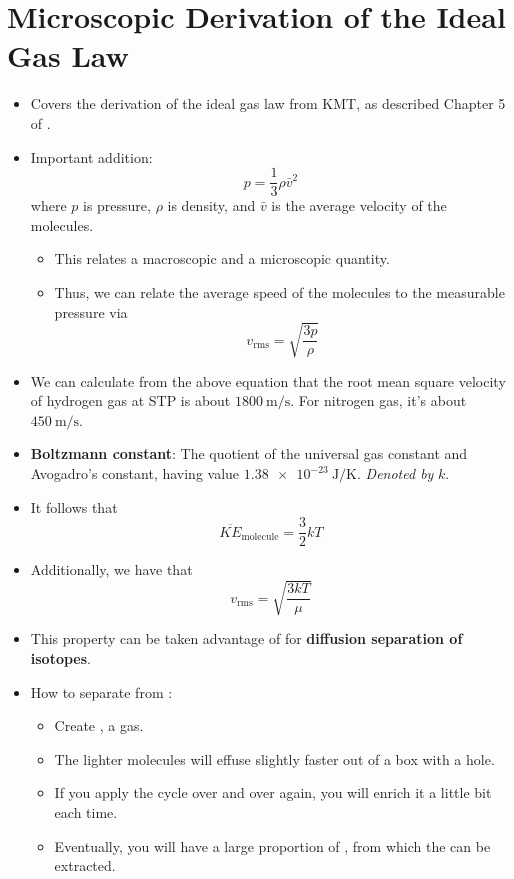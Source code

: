 \documentclass[../notes.tex]{subfiles}
\begin{document}
\section{Microscopic Derivation of the Ideal Gas Law}
\begin{itemize}
    \item Covers the derivation of the ideal gas law from KMT, as described Chapter 5 of \textcite{bib:APChemNotes}.
    \item Important addition:
    \begin{equation*}
        p = \frac{1}{3}\rho\bar{v}^2
    \end{equation*}
    where $p$ is pressure, $\rho$ is density, and $\bar{v}$ is the average velocity of the molecules.
    \begin{itemize}
        \item This relates a macroscopic and a microscopic quantity.
        \item Thus, we can relate the average speed of the molecules to the measurable pressure via
        \begin{equation*}
            v_\text{rms} = \sqrt{\frac{3p}{\rho}}
        \end{equation*}
    \end{itemize}
    \item We can calculate from the above equation that the root mean square velocity of hydrogen gas at STP is about $\SI{1800}{\meter\per\second}$. For nitrogen gas, it's about $\SI{450}{\meter\per\second}$.
    \item \textbf{Boltzmann constant}: The quotient of the universal gas constant and Avogadro's constant, having value $\SI{1.38e-23}{\joule\per\kelvin}$. \emph{Denoted by} $k$.
    \item It follows that
    \begin{equation*}
        \overline{KE}_\text{molecule} = \frac{3}{2}kT
    \end{equation*}
    \item Additionally, we have that
    \begin{equation*}
        v_\text{rms} = \sqrt{\frac{3kT}{\mu}}
    \end{equation*}
    \item This property can be taken advantage of for \textbf{diffusion separation of isotopes}.
    \item How to separate  from :
    \begin{itemize}
        \item Create , a gas.
        \item The lighter molecules will effuse slightly faster out of a box with a hole.
        \item If you apply the cycle over and over again, you will enrich it a little bit each time.
        \item Eventually, you will have a large proportion of , from which the  can be extracted.
    \end{itemize}
\end{itemize}
\end{document}

